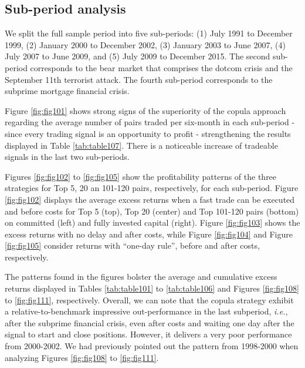 \documentclass[a4paper]{article}
\begin{document}
	\medskip
	
	\subsection{Sub-period analysis}
	
	We split the full sample period into five sub-periods: (1) July 1991 to December 1999, (2) January 2000 to December 2002, (3) January 2003 to June 2007, (4) July 2007 to June 2009, and (5) July 2009 to December 2015. The second sub-period corresponds to the bear market that comprises the dotcom crisis and the September 11th terrorist attack. The fourth sub-period corresponds to the subprime mortgage financial crisis.
	
	Figure \ref{fig:fig101} shows strong signs of the superiority of the copula approach regarding the average number of pairs traded per six-month in each sub-period - since every trading signal is an opportunity to profit - strengthening the results displayed in Table \ref{tab:table107}. There is a noticeable increase of tradeable signals in the last two sub-periods.
	
	

	Figures \ref{fig:fig102} to \ref{fig:fig105} show the profitability patterns of the three strategies for Top 5, 20 an 101-120 pairs, respectively, for each sub-period. Figure \ref{fig:fig102} displays the average excess returns when a fast trade can be executed and before costs for Top 5 (top), Top 20 (center) and Top 101-120 pairs (bottom) on committed (left) and fully invested capital (right). Figure \ref{fig:fig103} shows the excess returns with no delay and after costs, while Figure \ref{fig:fig104} and Figure \ref{fig:fig105} consider returns with “one-day rule”, before and after costs, respectively.
	
	The patterns found in the figures bolster the average and cumulative excess returns displayed in Tables \ref{tab:table101} to \ref{tab:table106} and Figures \ref{fig:fig108} to \ref{fig:fig111}, respectively. Overall, we can note that the copula strategy exhibit a relative-to-benchmark impressive out-performance in the last subperiod, \emph{i.e.}, after the subprime financial crisis, even after costs and waiting one day after the signal to start and close positions. However, it delivers a very poor performance from 2000-2002. We had previously pointed out the pattern from 1998-2000 when analyzing Figures \ref{fig:fig108} to \ref{fig:fig111}.
	
\end{document}
